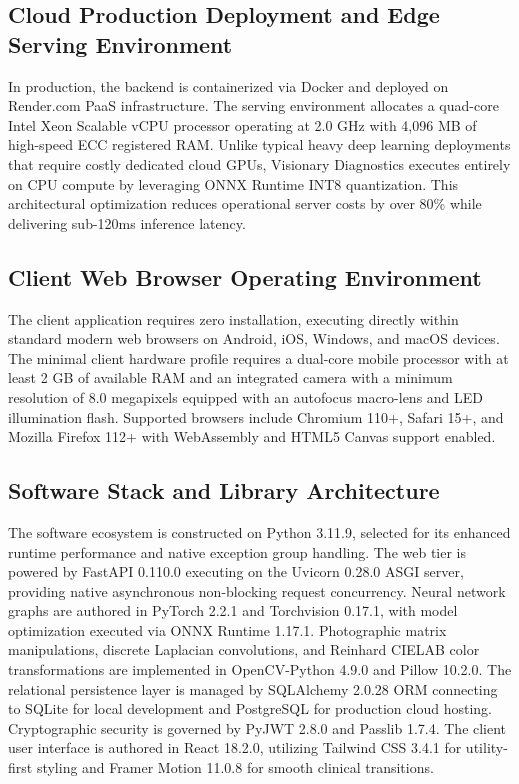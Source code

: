 \documentclass[12pt,a4paper,oneside]{report}
\begin{document}
\subsection{Cloud Production Deployment and Edge Serving Environment}
In production, the backend is containerized via Docker and deployed on Render.com PaaS infrastructure. The serving environment allocates a quad-core Intel Xeon Scalable vCPU processor operating at 2.0 GHz with 4,096 MB of high-speed ECC registered RAM. Unlike typical heavy deep learning deployments that require costly dedicated cloud GPUs, Visionary Diagnostics executes entirely on CPU compute by leveraging ONNX Runtime INT8 quantization. This architectural optimization reduces operational server costs by over 80\% while delivering sub-120ms inference latency.

\subsection{Client Web Browser Operating Environment}
The client application requires zero installation, executing directly within standard modern web browsers on Android, iOS, Windows, and macOS devices. The minimal client hardware profile requires a dual-core mobile processor with at least 2 GB of available RAM and an integrated camera with a minimum resolution of 8.0 megapixels equipped with an autofocus macro-lens and LED illumination flash. Supported browsers include Chromium 110+, Safari 15+, and Mozilla Firefox 112+ with WebAssembly and HTML5 Canvas support enabled.

\subsection{Software Stack and Library Architecture}
The software ecosystem is constructed on Python 3.11.9, selected for its enhanced runtime performance and native exception group handling. The web tier is powered by FastAPI 0.110.0 executing on the Uvicorn 0.28.0 ASGI server, providing native asynchronous non-blocking request concurrency. Neural network graphs are authored in PyTorch 2.2.1 and Torchvision 0.17.1, with model optimization executed via ONNX Runtime 1.17.1. Photographic matrix manipulations, discrete Laplacian convolutions, and Reinhard CIELAB color transformations are implemented in OpenCV-Python 4.9.0 and Pillow 10.2.0. The relational persistence layer is managed by SQLAlchemy 2.0.28 ORM connecting to SQLite for local development and PostgreSQL for production cloud hosting. Cryptographic security is governed by PyJWT 2.8.0 and Passlib 1.7.4. The client user interface is authored in React 18.2.0, utilizing Tailwind CSS 3.4.1 for utility-first styling and Framer Motion 11.0.8 for smooth clinical transitions.
\end{document}

